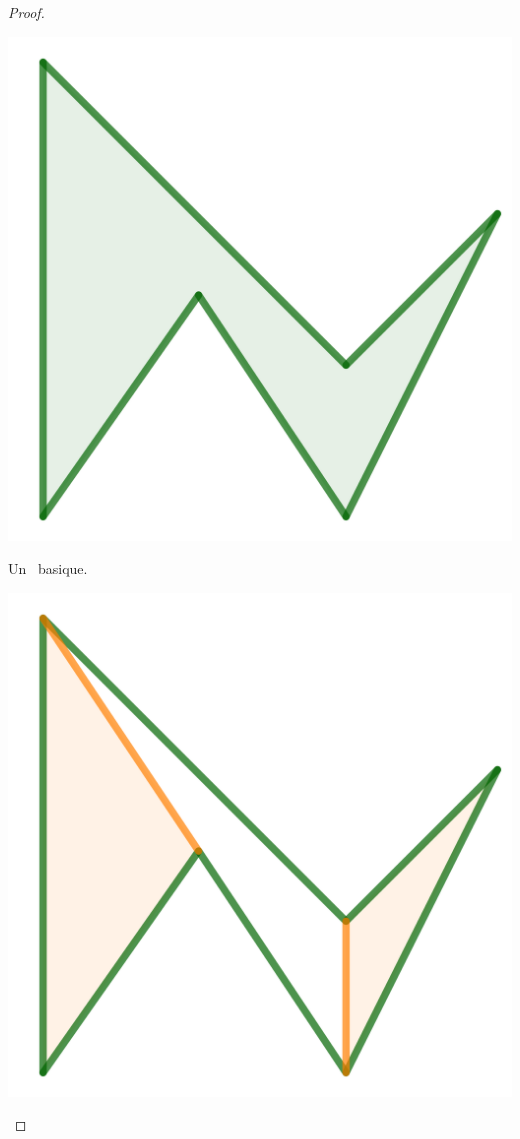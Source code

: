 \begin{proof}
    \begin{multicols}{2}
        \small\itshape
    	\begin{center}
        	\includegraphics[scale=.4]{content/polygon/alg-area/mini-ear-1.png}

        	\smallskip
       		Un \ngone\ basique.
    	\end{center}

    	\begin{center}
        	\includegraphics[scale=.4]{content/polygon/alg-area/mini-ear-2.png}


\end{center}
\end{multicols}
\end{proof}
